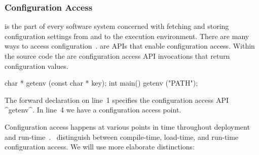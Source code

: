 \subsubsection{Configuration Access}

is the part of every software system concerned with fetching and storing configuration settings from and to the execution environment.
There are many ways to access configuration~\cite{kiciman2004discovering,xu2013blame,jin2014configurations}.
 are APIs that enable configuration access.
Within the source code the  are configuration access API invocations that return configuration values.

\pagebreak
\begin{example}
\fixtheorem

\begin{code}[language=Cpp]
char * getenv (const char * key);
int main()
{
    getenv ("PATH");
}
\end{code}

The forward declaration on line~1 specifies the configuration access API ^getenv^.
In line~4 we have a configuration access point.
\end{example}

Configuration access happens at various points in time throughout deployment and run-time~\cite{anthony2009context}.
\citet{kang1990feature}~distinguish between compile-time, load-time, and run-time configuration access.
We will use more elaborate distinctions:

